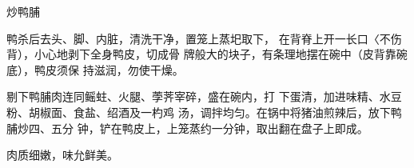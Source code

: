 \begin{recipe}{炒鸭脯}

\ingredients


\cooking

鸭杀后去头、脚、内脏，清洗干净，置笼上蒸圯取下， 在背脊上开一长口〈不伤背），小心地剥下全身鸭皮，切成骨 牌般大的块子，有条理地摆在碗中（皮背靠碗底），鸭皮须保 持滋润，勿使干燥。

剔下鸭脯肉连同鳐蛀、火腿、荸荠宰碎，盛在碗内，打 下蛋清，加进味精、水豆粉、胡椒面、食盐、绍酒及一杓鸡 汤，调拌均匀。在锅中将猪油煎辣后，放下鸭脯炒四、五分 钟，铲在鸭皮上，上笼蒸约一分钟，取出翻在盘子上即成。

\notes

肉质细嫩，味允鲜美。

\end{recipe}

